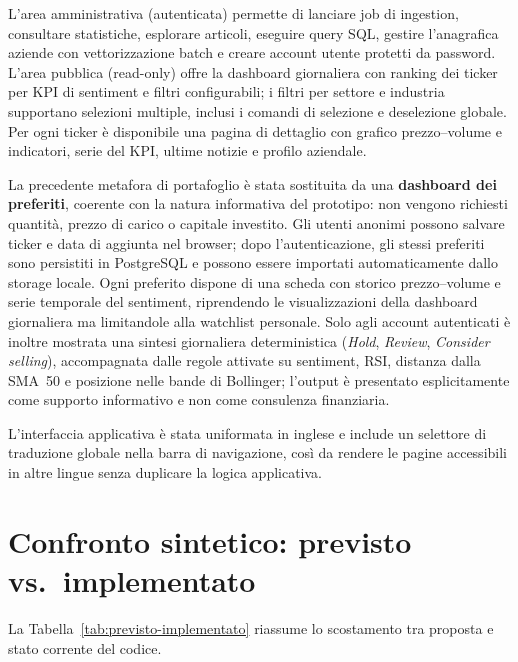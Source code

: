 L'area amministrativa (autenticata) permette di lanciare job di ingestion, consultare statistiche, esplorare articoli, eseguire query SQL, gestire l'anagrafica aziende con vettorizzazione batch e creare account utente protetti da password.
L'area pubblica (read-only) offre la dashboard giornaliera con ranking dei ticker per KPI di sentiment e filtri configurabili; i filtri per settore e industria supportano selezioni multiple, inclusi i comandi di selezione e deselezione globale. Per ogni ticker è disponibile una pagina di dettaglio con grafico prezzo--volume e indicatori, serie del KPI, ultime notizie e profilo aziendale.

La precedente metafora di portafoglio è stata sostituita da una \textbf{dashboard dei preferiti}, coerente con la natura informativa del prototipo: non vengono richiesti quantità, prezzo di carico o capitale investito. Gli utenti anonimi possono salvare ticker e data di aggiunta nel browser; dopo l'autenticazione, gli stessi preferiti sono persistiti in PostgreSQL e possono essere importati automaticamente dallo storage locale. Ogni preferito dispone di una scheda con storico prezzo--volume e serie temporale del sentiment, riprendendo le visualizzazioni della dashboard giornaliera ma limitandole alla watchlist personale. Solo agli account autenticati è inoltre mostrata una sintesi giornaliera deterministica (\textit{Hold}, \textit{Review}, \textit{Consider selling}), accompagnata dalle regole attivate su sentiment, RSI, distanza dalla SMA~50 e posizione nelle bande di Bollinger; l'output è presentato esplicitamente come supporto informativo e non come consulenza finanziaria.

L'interfaccia applicativa è stata uniformata in inglese e include un selettore di traduzione globale nella barra di navigazione, così da rendere le pagine accessibili in altre lingue senza duplicare la logica applicativa.

\section{Confronto sintetico: previsto vs.\ implementato}

La Tabella~\ref{tab:previsto-implementato} riassume lo scostamento tra proposta e stato corrente del codice.

